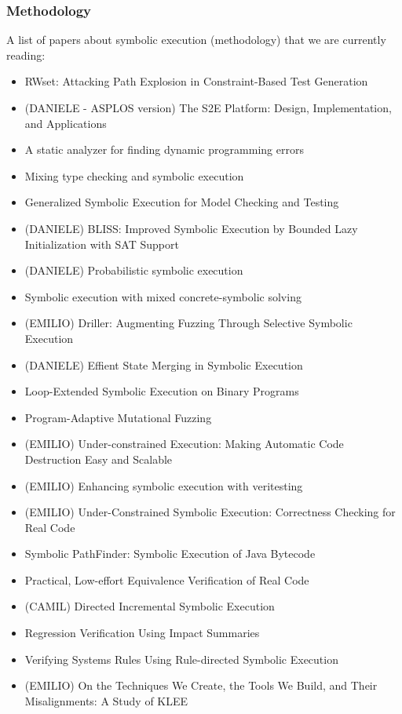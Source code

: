 \documentclass[10pt, a4paper]{article}
\begin{document}
\subsubsection{Methodology}
A list of papers about symbolic execution (methodology) that we are currently reading:
\begin{itemize}
  \item \cite{BCE-TACAS08} RWset: Attacking Path Explosion in Constraint-Based Test Generation
  \item (DANIELE - ASPLOS version) \cite{CKC-TOCS12} The S2E Platform: Design, Implementation, and Applications
  \item \cite{BPS-SPE00} A static analyzer for finding dynamic programming errors
  \item \cite{KCF-PLDI10} Mixing type checking and symbolic execution
  \item \cite{KPV-TACAS03} Generalized Symbolic Execution for Model Checking and Testing
  \item (DANIELE) \cite{BLISS-TSE15} BLISS: Improved Symbolic Execution by Bounded Lazy Initialization with SAT Support
  \item (DANIELE) \cite{GDV-ISSTA12} Probabilistic symbolic execution
  \item \cite{PRV-ISSTA11} Symbolic execution with mixed concrete-symbolic solving
  \item (EMILIO) \cite{DRILLER-NDSS16} Driller: Augmenting Fuzzing Through Selective Symbolic Execution 
  \item (DANIELE) \cite{KKB-PLDI12} Effient State Merging in Symbolic Execution
  \item \cite{SPM-ISSTA09} Loop-Extended Symbolic Execution on Binary Programs
  \item \cite{CWD-SSP15} Program-Adaptive Mutational Fuzzing
  \item (EMILIO) \cite{ED-ISSTA07} Under-constrained Execution: Making Automatic Code Destruction Easy and Scalable
  \item (EMILIO) \cite{VERITESTING-ICSE14} Enhancing symbolic execution with veritesting
  \item (EMILIO) \cite{UCKLEE-USEC15} Under-Constrained Symbolic Execution: Correctness Checking for Real Code
  \item \cite{PATHFINDER-ASE10} Symbolic PathFinder: Symbolic Execution of Java Bytecode
  \item \cite{RE-CAV11} Practical, Low-effort Equivalence Verification of Real Code
  \item (CAMIL)\cite{PYR-PLDI11} Directed Incremental Symbolic Execution
  \item \cite{BPR-SPIN13} Regression Verification Using Impact Summaries
  \item \cite{CHW-ASPLOS13} Verifying Systems Rules Using Rule-directed Symbolic Execution
  \item \cite{RED-ICSE16} (EMILIO) On the Techniques We Create, the Tools We Build, and Their Misalignments: A Study of KLEE
\end{itemize}
\end{document}
